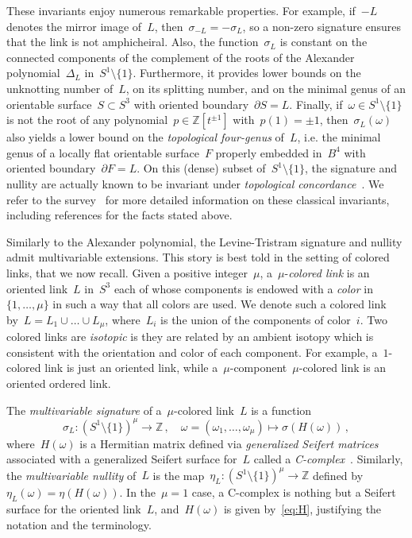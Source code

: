 \documentclass{amsart}
\newcommand{\Z}{\mathbb{Z}}
\theoremstyle{definition}
\theoremstyle{remark}
\begin{document}
These invariants enjoy numerous remarkable properties. For example, if~$-L$ denotes the mirror image of~$L$, then~$\sigma_{-L}=-\sigma_L$, so a non-zero signature ensures that the link is not amphicheiral. Also, the function~$\sigma_L$
is constant on the connected components of the complement of the roots of the Alexander polynomial~$\Delta_L$ in~$S^1\setminus\{1\}$. Furthermore, it provides lower bounds on the unknotting number of~$L$, on its splitting number, and on the minimal genus of an orientable surface~$S\subset S^3$ with oriented boundary~$\partial S=L$.
Finally, if~$\omega\in S^1\setminus\{1\}$ is not the root of any polynomial~$p\in\Z[t^{\pm 1}]$ with~$p(1)=\pm 1$, then~$\sigma_L(\omega)$
also yields a lower bound on the {\em topological four-genus\/} of~$L$, i.e. the minimal genus of a locally flat orientable surface~$F$ properly embedded in~$B^4$ with oriented boundary~$\partial F=L$. On this (dense) subset of~$S^1\setminus\{1\}$, the signature and nullity are actually known to be invariant under {\em topological concordance\/}~\cite{NP17}. We refer to the survey~\cite{Conway-survey} for more detailed information on these classical invariants, including references for the facts stated above.

\medskip

Similarly to the Alexander polynomial, the Levine-Tristram signature and nullity admit multivariable extensions. This story is best told in the setting of colored links, that we now recall.
Given a positive integer~$\mu$, a~$\mu$-{\em colored link} is an oriented link~$L$ in~$S^3$ each of whose components
is endowed with a {\em color\/} in~$\{1,\dots,\mu\}$ in such a way that all colors are used. We denote such a colored link by~$L=L_1\cup\dots\cup L_\mu$, where~$L_i$ is the union of the components of color~$i$. Two colored links are {\em isotopic\/} is they are related by an ambient isotopy which is consistent with the orientation and color of each component.
For example, a~$1$-colored link is just an oriented link, while a~$\mu$-component~$\mu$-colored link is an oriented ordered link.

The {\em multivariable signature\/} of a~$\mu$-colored link~$L$ is a function
\[
\sigma_L\colon (S^1\setminus\{1\})^\mu\longrightarrow \Z\,,\quad \omega=(\omega_1,\dots,\omega_\mu)\longmapsto\sigma(H(\omega))\,,
\]
where~$H(\omega)$ is a Hermitian matrix defined via {\em generalized Seifert matrices\/} associated with a generalized
Seifert surface for~$L$ called a {\em C-complex\/}~\cite{Cooper,CF08,DMO}. Similarly, the {\em multivariable nullity\/} of~$L$ is the map~$\eta_L\colon (S^1\setminus\{1\})^\mu\to\Z$ defined by~$\eta_L(\omega)=\eta(H(\omega))$.
In the~$\mu=1$ case, a C-complex is nothing but a Seifert surface for the oriented link~$L$, and~$H(\omega)$ is given
by~\eqref{eq:H}, justifying the notation and the terminology.
\end{document}
